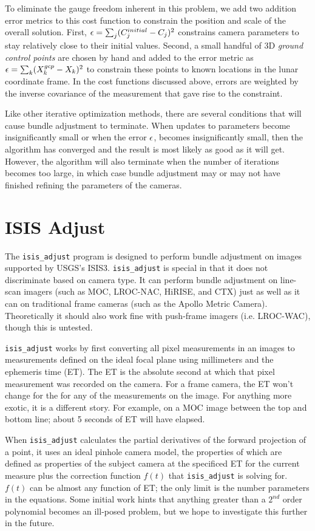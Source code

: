 To eliminate the gauge freedom inherent in this problem, we add two
addition error metrics to this cost function to constrain the position
and scale of the overall solution. First, ${\bf \epsilon} =
\sum_j(C_j^{initial}-C_j)^2$ constrains camera parameters to stay
relatively close to their initial values.  Second, a small handful of
3D {\em ground control points} are chosen by hand and added to the
error metric as ${\bf \epsilon} = \sum_k(X_k^{gcp}-X_k)^2$ to
constrain these points to known locations in the lunar coordinate
frame.  In the cost functions discussed above, errors are weighted by
the inverse covariance of the measurement that gave rise to the
constraint.

Like other iterative optimization methods, there are several
conditions that will cause bundle adjustment to terminate.  When
updates to parameters become insignificantly small or when the error
${\bf \epsilon}$, becomes insignificantly small, then the algorithm
has converged and the result is most likely as good as it will get.
However, the algorithm will also terminate when the number of
iterations becomes too large, in which case bundle adjustment may or
may not have finished refining the parameters of the cameras.  

\section{ISIS Adjust}

The \texttt{isis\_adjust} program is designed to perform bundle
adjustment on images supported by USGS's ISIS3. \texttt{isis\_adjust}
is special in that it does not discriminate based on camera type. It
can perform bundle adjustment on line-scan imagers (such as MOC,
LROC-NAC, HiRISE, and CTX) just as well as it can on traditional frame
cameras (such as the Apollo Metric Camera). Theoretically it should
also work fine with push-frame imagers (i.e. LROC-WAC), though this is
untested.

\texttt{isis\_adjust} works by first converting all pixel measurements
in an images to measurements defined on the ideal focal plane using
millimeters and the ephemeris time (ET). The ET is the absolute second
at which that pixel measurement was recorded on the camera.  For a
frame camera, the ET won't change for the for any of the measurements
on the image. For anything more exotic, it is a different story. For
example, on a MOC image between the top and bottom line; about 5
seconds of ET will have elapsed.


When \texttt{isis\_adjust} calculates the partial derivatives of the
forward projection of a point, it uses an ideal pinhole camera model,
the properties of which are defined as properties of the subject
camera at the specificed ET for the current measure plus the
correction function $f(t)$ that \texttt{isis\_adjust} is solving
for. $f(t)$ can be almost any function of ET; the only limit is the
number parameters in the equations. Some initial work hints that
anything greater than a $2^{nd}$ order polynomial becomes an ill-posed
problem, but we hope to investigate this further in the future.

